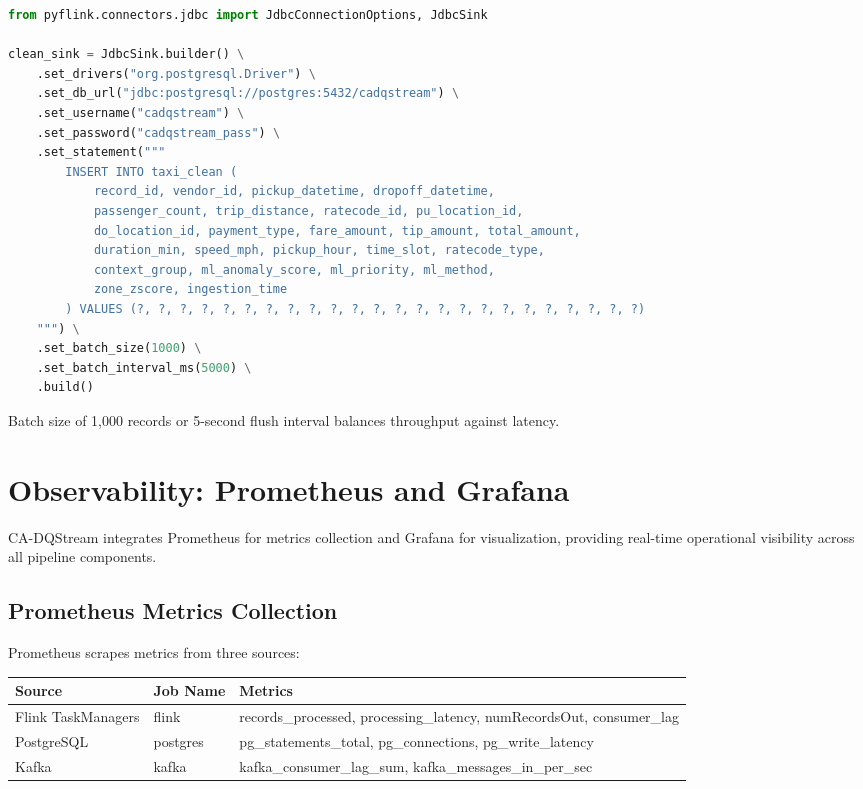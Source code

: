 \begin{lstlisting}[language=Python]
from pyflink.connectors.jdbc import JdbcConnectionOptions, JdbcSink

clean_sink = JdbcSink.builder() \
    .set_drivers("org.postgresql.Driver") \
    .set_db_url("jdbc:postgresql://postgres:5432/cadqstream") \
    .set_username("cadqstream") \
    .set_password("cadqstream_pass") \
    .set_statement("""
        INSERT INTO taxi_clean (
            record_id, vendor_id, pickup_datetime, dropoff_datetime,
            passenger_count, trip_distance, ratecode_id, pu_location_id,
            do_location_id, payment_type, fare_amount, tip_amount, total_amount,
            duration_min, speed_mph, pickup_hour, time_slot, ratecode_type,
            context_group, ml_anomaly_score, ml_priority, ml_method,
            zone_zscore, ingestion_time
        ) VALUES (?, ?, ?, ?, ?, ?, ?, ?, ?, ?, ?, ?, ?, ?, ?, ?, ?, ?, ?, ?, ?, ?, ?, ?)
    """) \
    .set_batch_size(1000) \
    .set_batch_interval_ms(5000) \
    .build()
\end{lstlisting}

Batch size of 1,000 records or 5-second flush interval balances throughput against latency.

\section{Observability: Prometheus and Grafana}

CA-DQStream integrates Prometheus for metrics collection and Grafana for visualization, providing real-time operational visibility across all pipeline components.

\subsection{Prometheus Metrics Collection}

Prometheus scrapes metrics from three sources:

\begin{longtable}{|m{4cm}|m{3.5cm}|m{6cm}|}
\hline
\textbf{Source} & \textbf{Job Name} & \textbf{Metrics} \\ \hline
Flink TaskManagers & flink & records\_processed, processing\_latency, numRecordsOut, consumer\_lag \\ \hline
PostgreSQL & postgres & pg\_statements\_total, pg\_connections, pg\_write\_latency \\ \hline
Kafka & kafka & kafka\_consumer\_lag\_sum, kafka\_messages\_in\_per\_sec \\ \hline
\end{longtable}

